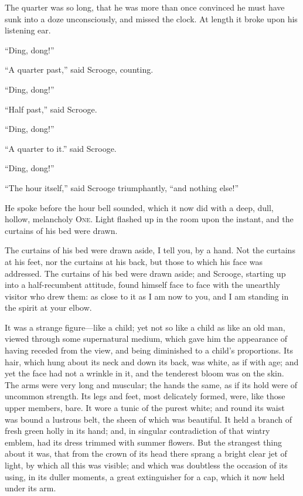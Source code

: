\documentclass[paper=5.5in:8.5in,BCOR=15mm,twoside,DIV=15,headinclude=off,12pt,chapterprefix=off,openany,headings=huge]{scrbook} %
\begin{document}
The quarter was so long, that he was more than once convinced he must have sunk into a doze unconsciously, and missed the clock. At length it broke upon his listening ear.

\enquote{Ding, dong!}

\enquote{A quarter past,} said Scrooge, counting.

\enquote{Ding, dong!}

\enquote{Half past,} said Scrooge.

\enquote{Ding, dong!}

\enquote{A quarter to it.} said Scrooge.

\enquote{Ding, dong!}

\enquote{The hour itself,} said Scrooge triumphantly, \enquote{and nothing else!}

He spoke before the hour bell sounded, which it now did with a deep, dull, hollow, melancholy \textsc{One}. Light flashed up in the room upon the instant, and the curtains of his bed were drawn.

The curtains of his bed were drawn aside, I tell you, by a hand. Not the curtains at his feet, nor the curtains at his back, but those to which his face was addressed. The curtains of his bed were drawn aside; and Scrooge, starting up into a half-recumbent attitude, found himself face to face with the unearthly visitor who drew them: as close to it as I am now to you, and I am standing in the spirit at your elbow.

It was a strange figure—like a child; yet not so like a child as like an old man, viewed through some supernatural medium, which gave him the appearance of having receded from the view, and being diminished to a child's proportions. Its hair, which hung about its neck and down its back, was white, as if with age; and yet the face had not a wrinkle in it, and the tenderest bloom was on the skin. The arms were very long and muscular; the hands the same, as if its hold were of uncommon strength. Its legs and feet, most delicately formed, were, like those upper members, bare. It wore a tunic of the purest white; and round its waist was bound a lustrous belt, the sheen of which was beautiful. It held a branch of fresh green holly in its hand; and, in singular contradiction of that wintry emblem, had its dress trimmed with summer flowers. But the strangest thing about it was, that from the crown of its head there sprang a bright clear jet of light, by which all this was visible; and which was doubtless the occasion of its using, in its duller moments, a great extinguisher for a cap, which it now held under its arm.
\end{document}
